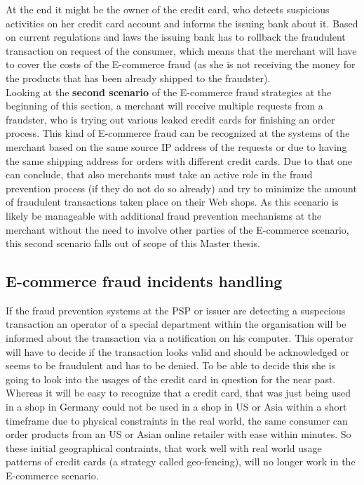 At the end it might be the owner of the credit card, who detects suspicious activities on her credit card account and informs the issuing bank about it. Based on current regulations and laws the issuing bank has to rollback the fraudulent transaction on request of the consumer, which means that the merchant will have to cover the costs of the E-commerce fraud (as she is not receiving the money for the products that has been already shipped to the fraudster). \\

Looking at the \textbf{second scenario} of the E-commerce fraud strategies at the beginning of this section, a merchant will receive multiple requests from a fraudster, who is trying out various leaked credit cards for finishing an order process. This kind of E-commerce fraud can be recognized at the systems of the merchant based on the same source \gls{IP} address of the requests or due to having the same shipping address for orders with different credit cards. Due to that one can conclude, that also merchants must take an active role in the fraud prevention process (if they do not do so already) and try to minimize the amount of fraudulent transactions taken place on their Web shops. As this scenario is likely be manageable with additional fraud prevention mechanisms at the merchant without the need to involve other parties of the E-commerce scenario, this second scenario falls out of scope of this Master thesis.


\subsection{E-commerce fraud incidents handling}
\label{subsec:e_commerce_fraud_handling}

If the fraud prevention systems at the \gls{PSP} or issuer are detecting a suspecious transaction an operator of a special department within the organisation will be informed about the transaction via a notification on his computer. This operator will have to decide if the transaction looks valid and should be acknowledged or seems to be fraudulent and has to be denied. To be able to decide this she is going to look into the usages of the credit card in question for the near past. Whereas it will be easy to recognize that a credit card, that was just being used in a shop in Germany could not be used in a shop in US or Asia within a short timeframe due to physical constraints in the real world, the same consumer can order products from an US or Asian online retailer with ease within minutes. So these initial geographical contraints, that work well with real world usage patterns of credit cards (a strategy called geo-fencing), will no longer work in the E-commerce scenario. \\

